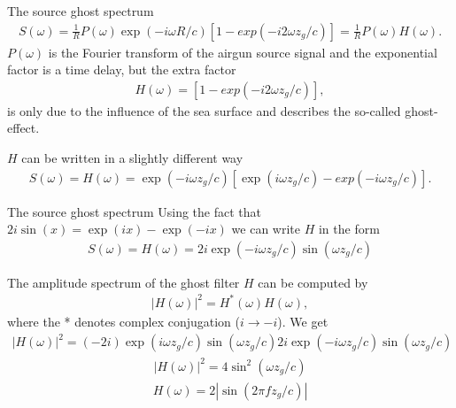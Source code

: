 \documentclass[xcolor=dvipsnames,notes]{beamer}
\begin{document}
\begin{frame}{The source ghost spectrum}
\begin{eqnarray}
S(\omega) = 
  \frac{1}{R}P(\omega)\exp(-i\omega R/c) \left[1-exp(-i2\omega z_g/c)\right] 
   = \frac{1}{R}P(\omega)H(\omega).
\end{eqnarray}
$P(\omega)$ is the Fourier transform of the airgun source signal and the exponential factor is a time delay,  but
the extra factor
\begin{eqnarray}
  H(\omega)=\left[1-exp(-i2\omega z_g/c)\right], 
\end{eqnarray}
is only due to the influence of the sea surface and
describes the so-called ghost-effect.

$H$ can be written in a slightly different way
\begin{eqnarray}
S(\omega) = 
  H(\omega)=\exp(-i\omega z_g/c)
           \left[\exp(i\omega z_g/c)-exp(-i\omega z_g/c)\right].
\end{eqnarray}
\end{frame}
\begin{frame}{The source ghost spectrum}
Using the fact that $2i\sin(x) = \exp(ix)-\exp(-ix)$
we can write $H$ in the form
\begin{eqnarray}
S(\omega) = 
  H(\omega)=2i\exp(-i\omega z_g/c)\sin(\omega z_g/c)
\end{eqnarray}

The amplitude spectrum of the ghost filter $H$ can be computed by
\begin{eqnarray}
|H(\omega)|^2 = H^*(\omega)H(\omega),
\end{eqnarray}
where the * denotes complex conjugation ($i \rightarrow -i$).
We get
\begin{eqnarray}
|H(\omega)|^2 = (-2i)\exp(i\omega z_g/c)\sin(\omega z_g/c)
                2i\exp(-i\omega z_g/c)\sin(\omega z_g/c)
\end{eqnarray}
\begin{eqnarray}
|H(\omega)|^2 = 4\sin^2(\omega z_g/c)
\end{eqnarray}
\begin{eqnarray}
H(\omega) = 2|\sin(2\pi f z_g/c)|
\end{eqnarray}
\end{frame}
\end{document}
